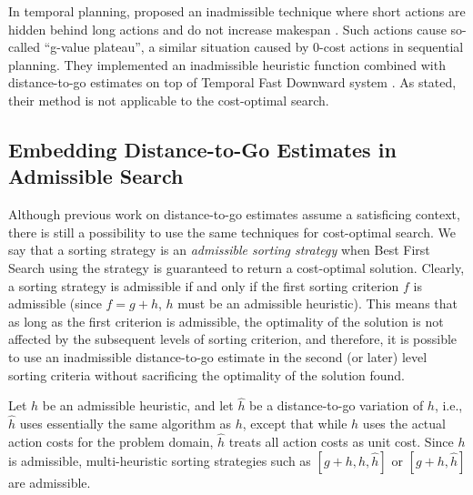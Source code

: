 In temporal planning,  proposed an inadmissible technique where short actions are
hidden behind long actions and do not increase makespan \cite{benton2010g}. Such actions cause so-called ``g-value
plateau'', a similar situation caused by 0-cost actions in sequential planning.  They implemented an inadmissible
heuristic function combined with distance-to-go estimates on top of Temporal Fast Downward system
\cite{eyerich2009using}.  As stated, their method is not applicable to the cost-optimal search.


\subsection{Embedding Distance-to-Go Estimates in Admissible Search}

Although previous work on distance-to-go estimates assume a satisficing context,
there is still a possibility to use the same techniques for cost-optimal search.
We say that a sorting strategy is an \emph{admissible sorting strategy}
when Best First Search using the strategy is guaranteed to return a cost-optimal solution.
Clearly, a sorting strategy is admissible if and only if the 
first sorting criterion $f$ is admissible (since $f=g+h$, $h$ must be an admissible heuristic).
This means that as long as the first criterion is admissible, the optimality of the solution is not affected by the
subsequent levels of sorting criterion, and therefore, it is possible to use an inadmissible distance-to-go estimate
in the second (or later) level sorting criteria without sacrificing the optimality of the solution found.

Let $h$ be an admissible heuristic, and
let $\hat{h}$ be a distance-to-go variation of $h$, i.e., $\hat{h}$ uses essentially the same algorithm as $h$, except that while $h$ uses the actual action costs for the problem domain, $\hat{h}$ treats all action costs as unit cost.
Since $h$ is admissible, multi-heuristic sorting strategies such as $[g+h,h,\hat{h}]$ or $[g+h,\hat{h}]$
are admissible.

